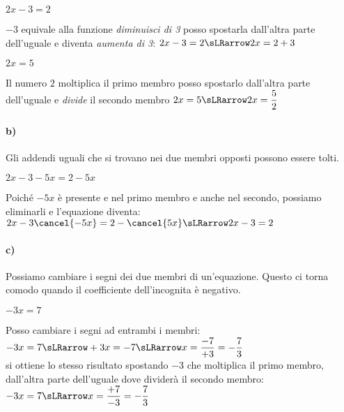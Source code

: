 \begin{esempio}{}{}
\qquad \(2x-3=2\)

\(-3\) equivale alla funzione \emph{diminuisci di 3} 
posso spostarla dall'altra parte dell'uguale e diventa 
\emph{aumenta di 3}:
\(2x-3=2 \sLRarrow 2x=2+3\)
\end{esempio}

\begin{esempio}{}{}
\qquad \(2x=5\)

Il numero \(2\) moltiplica il primo membro 
posso spostarlo dall'altra parte dell'uguale e
\emph{divide} il secondo membro
\(2x=5 \sLRarrow 2x=\dfrac{5}{2}\)
\end{esempio}

\paragraph{b)}
Gli addendi uguali che si trovano nei due membri opposti possono essere 
tolti.

\begin{esempio}{}{}
\qquad \(2x-3-5x=2-5x\)

Poiché \(-5x\) è presente e nel primo membro e anche nel secondo, 
possiamo eliminarli e l'equazione diventa:
\(2x-3\cancel{-5x}=2-\cancel{5x} \sLRarrow 2x-3=2\)
\end{esempio}

\paragraph{c)} 
Possiamo cambiare i segni dei due membri di un'equazione. 
Questo ci torna comodo quando il coefficiente dell'incognita è negativo.

\begin{esempio}{}{}
\qquad \(-3x=7\)

Posso cambiare i segni ad entrambi i membri:\\ 
\(-3x=7 \sLRarrow +3x=-7 \sLRarrow x=\dfrac{-7}{+3}=-\dfrac{7}{3}\)\\
si ottiene lo stesso risultato spostando \(-3\) che moltiplica il primo 
membro, dall'altra parte dell'uguale dove dividerà il secondo membro:\\ 
\(-3x=7 \sLRarrow x=\dfrac{+7}{-3}=-\dfrac{7}{3}\)
\end{esempio}

